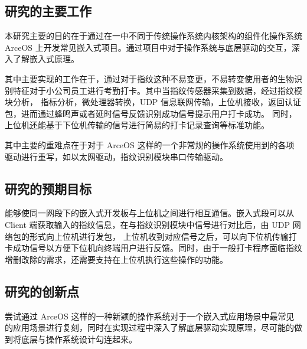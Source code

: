 \subsection{研究的主要工作}

    本研究主要的目的在于通过在一中不同于传统操作系统内核架构的组件化操作系统 ArceOS 上开发常见嵌入式项目。通过项目中对于操作系统与底层驱动的交互，深入了解嵌入式原理。

    其中主要实现的工作在于，通过对于指纹这种不易变更，不易转变使用者的生物识别特征对于小公司员工进行考勤打卡。其中当指纹传感器采集到数据，经过指纹模块分析，
    指标分析，微处理器转换，UDP 信息联网传输，上位机接收，返回认证包，进而通过蜂鸣声或者延时信号反馈识别成功信号提示用户打卡成功。
    同时，上位机还能基于下位机传输的信号进行简易的打卡记录查询等标准功能。

    其中主要的重难点在于对于 ArceOS 这样的一个非常规的操作系统使用到的各项驱动进行重写，如以太网驱动，指纹识别模块串口传输驱动。

\subsection{研究的预期目标}

    能够使同一网段下的嵌入式开发板与上位机之间进行相互通信。嵌入式段可以从 Client 端获取输入的指纹信息，在与指纹识别模块中信号进行对比后，由 UDP 网络包的形式向上位机进行发包，
    上位机收到对应信号之后，可以向下位机传输打卡成功信号以方便下位机向终端用户进行反馈。同时，由于一般打卡程序面临指纹增删改除的需求，还需要支持在上位机执行这些操作的功能。

\subsection{研究的创新点}
    
    尝试通过 ArceOS 这样的一种新颖的操作系统对于一个嵌入式应用场景中最常见的应用场景进行复刻，同时在实现过程中深入了解底层驱动实现原理，尽可能的做到将底层与操作系统设计勾连起来。



